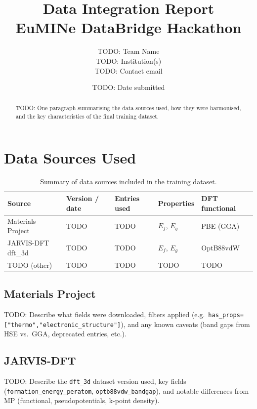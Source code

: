 \documentclass[10pt, a4paper]{article}
\title{%
  \textbf{Data Integration Report}\\[4pt]
  {\large EuMINe DataBridge Hackathon \hackathonyear}
}
\author{
  TODO: Team Name \\
  \small TODO: Institution(s) \\
  \small TODO: Contact email
}
\date{TODO: Date submitted}
\begin{document}
\maketitle
\thispagestyle{fancy}

\begin{abstract}
TODO: One paragraph summarising the data sources used, how they were
harmonised, and the key characteristics of the final training dataset.
\end{abstract}

\tableofcontents
\vspace{1em}

\section{Data Sources Used}

\begin{table}[h!]
\centering
\caption{Summary of data sources included in the training dataset.}
\label{tab:sources}
\begin{tabular}{@{}lllll@{}}
\toprule
Source & Version / date & Entries used & Properties & DFT functional \\
\midrule
Materials Project  & TODO & TODO & \(E_f\), \(E_g\) & PBE (GGA) \\
JARVIS-DFT dft\_3d & TODO & TODO & \(E_f\), \(E_g\) & OptB88vdW \\
TODO (other)       & TODO & TODO & TODO             & TODO \\
\bottomrule
\end{tabular}
\end{table}

\subsection{Materials Project}
TODO: Describe what fields were downloaded, filters applied (e.g.\
\texttt{has\_props=["thermo","electronic\_structure"]}), and any known
caveats (band gaps from HSE vs.\ GGA, deprecated entries, etc.).

\subsection{JARVIS-DFT}
TODO: Describe the \texttt{dft\_3d} dataset version used, key fields
(\texttt{formation\_energy\_peratom}, \texttt{optb88vdw\_bandgap}), and
notable differences from MP (functional, pseudopotentials, k-point density).
\end{document}
